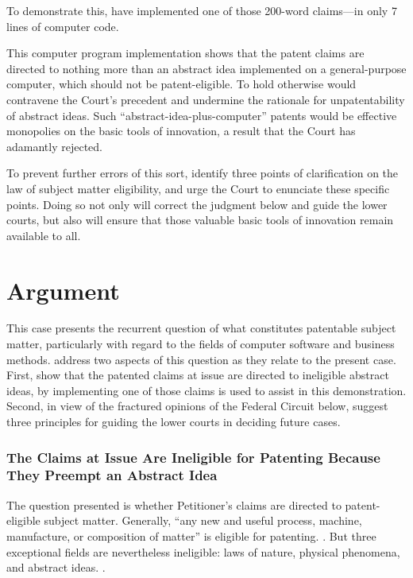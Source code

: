 \documentclass{scotus}
\begin{document}
To demonstrate this, \amici have implemented one of those 200-word
claims---in only 7 lines of computer code.

This computer program implementation shows that the patent
claims are directed to nothing more than an abstract idea implemented on a
general-purpose computer, which should not be patent-eligible.
%
To hold otherwise would contravene the
Court's precedent and undermine the rationale for unpatentability of
abstract ideas. Such ``abstract-idea-plus-computer'' patents would be effective
monopolies on the basic tools of innovation, a result that the
Court has adamantly rejected.

To prevent further errors of this sort, \amici identify three points of
clarification on the law of subject matter eligibility, and urge the Court to
enunciate these specific points. Doing so not
only will correct the judgment below and guide the lower courts, but also will
ensure that those valuable basic tools of innovation remain available to all.

\part{Argument}

This case presents the recurrent question of what constitutes patentable
subject matter, particularly with regard to the fields of computer software and
business methods. \Amici address two aspects of this question as they relate to
the present case. First, \amici show that the patented claims at issue are
directed to ineligible abstract ideas, by
implementing one of those claims is used to assist in this demonstration.
Second, in view of the fractured opinions of the Federal Circuit below, \amici
suggest three principles for guiding the lower courts in deciding future cases.



%
%
\section{The Claims at Issue Are Ineligible for Patenting Because They
Preempt an Abstract Idea}

The question presented is whether Petitioner's claims are directed to
patent-eligible subject matter. Generally, ``any new and
useful process, machine, manufacture, or composition of matter'' is eligible for
patenting. . But three exceptional fields
are nevertheless ineligible: laws of nature, physical phenomena, and abstract
ideas. .
\end{document}
